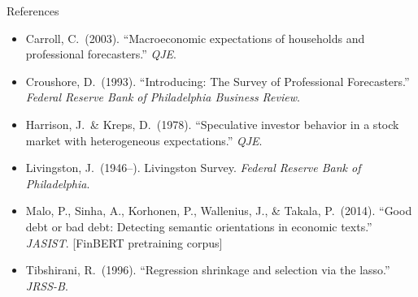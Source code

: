 \documentclass[aspectratio=169, 11pt]{beamer}
\begin{document}
\begin{frame}[allowframebreaks]{References}
\begin{itemize}\small
  \item Carroll, C.\ (2003). ``Macroeconomic expectations of households and professional forecasters.'' \textit{QJE}.
  \item Croushore, D.\ (1993). ``Introducing: The Survey of Professional Forecasters.'' \textit{Federal Reserve Bank of Philadelphia Business Review}.
  \item Harrison, J.\ \& Kreps, D.\ (1978). ``Speculative investor behavior in a stock market with heterogeneous expectations.'' \textit{QJE}.
  \item Livingston, J.\ (1946--). Livingston Survey. \textit{Federal Reserve Bank of Philadelphia}.
  \item Malo, P., Sinha, A., Korhonen, P., Wallenius, J., \& Takala, P.\ (2014). ``Good debt or bad debt: Detecting semantic orientations in economic texts.'' \textit{JASIST}. [FinBERT pretraining corpus]
  \item Tibshirani, R.\ (1996). ``Regression shrinkage and selection via the lasso.'' \textit{JRSS-B}.
\end{itemize}
\end{frame}
\end{document}
